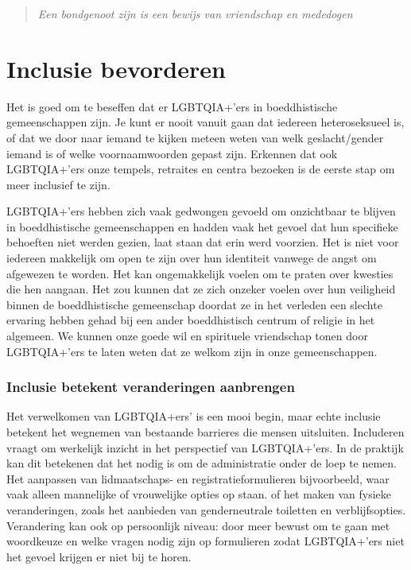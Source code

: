 \documentclass[12pt,openany]{book}
\begin{document}
\begin{quote}
\textit{Een bondgenoot zijn is een bewijs van vriendschap en mededogen}
\end{quote}

\section*{Inclusie bevorderen}

Het is goed om te beseffen dat er LGBTQIA+’ers in boeddhistische gemeenschappen zijn. Je kunt er nooit vanuit gaan dat iedereen heteroseksueel is, of dat we door naar iemand te kijken meteen weten van welk geslacht/gender iemand is of welke voornaamwoorden gepast zijn. Erkennen dat ook LGBTQIA+’ers onze tempels, retraites en centra bezoeken is de eerste stap om meer inclusief te zijn.

LGBTQIA+’ers hebben zich vaak gedwongen gevoeld om onzichtbaar te blijven in boeddhistische gemeenschappen en hadden vaak het gevoel dat hun specifieke behoeften niet werden gezien, laat staan dat erin werd voorzien.  Het is niet voor iedereen makkelijk om open te zijn over hun identiteit vanwege de angst om afgewezen te worden. Het kan ongemakkelijk voelen om te praten over kwesties die hen aangaan. Het zou kunnen dat ze zich onzeker voelen over hun veiligheid binnen de boeddhistische gemeenschap doordat ze in het verleden een slechte ervaring hebben gehad bij een ander boeddhistisch centrum of religie in het algemeen. We kunnen onze goede wil en spirituele vriendschap tonen door LGBTQIA+’ers te laten weten dat ze welkom zijn in onze gemeenschappen.

\subsubsection*{Inclusie betekent veranderingen aanbrengen}

Het verwelkomen van LGBTQIA+ers’ is een mooi begin, maar echte inclusie betekent het wegnemen van bestaande barrieres die mensen uitsluiten. Includeren vraagt om werkelijk inzicht in het perspectief van LGBTQIA+’ers. In de praktijk kan dit betekenen dat het nodig is om de administratie onder de loep te nemen. Het aanpassen van lidmaatschaps- en registratieformulieren bijvoorbeeld, waar vaak alleen mannelijke of vrouwelijke opties op staan. of het maken van fysieke veranderingen, zoals het aanbieden van genderneutrale toiletten en verblijfsopties.  Verandering kan ook op persoonlijk niveau: door meer bewust om te gaan met woordkeuze en welke vragen nodig zijn op formulieren zodat LGBTQIA+’ers niet het gevoel krijgen er niet bij te horen.
\end{document}
